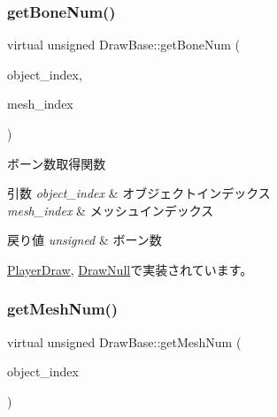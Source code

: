 \mbox{\label{class_draw_base_a9420d7257415446e8cddd1a22f139dd3}} 
\subsubsection{\texorpdfstring{get\+Bone\+Num()}{getBoneNum()}}
{\footnotesize\ttfamily virtual unsigned Draw\+Base\+::get\+Bone\+Num (\begin{DoxyParamCaption}\item[{unsigned}]{object\+\_\+index,  }\item[{unsigned}]{mesh\+\_\+index }\end{DoxyParamCaption})\hspace{0.3cm}{\ttfamily [pure virtual]}}



ボーン数取得関数 


\begin{DoxyParams}{引数}
{\em object\+\_\+index} & オブジェクトインデックス \\
\hline
{\em mesh\+\_\+index} & メッシュインデックス \\
\hline
\end{DoxyParams}

\begin{DoxyRetVals}{戻り値}
{\em unsigned} & ボーン数 \\
\hline
\end{DoxyRetVals}


\mbox{\hyperlink{class_player_draw_a716aeac1dca9a44c97bc2ea42e55d6f6}{Player\+Draw}}, \mbox{\hyperlink{class_draw_null_a74aee63e6146b7256b80610abfb3eabb}{Draw\+Null}}で実装されています。

\mbox{\label{class_draw_base_add488139aed539e7ccd19492702b4bee}} 
\subsubsection{\texorpdfstring{get\+Mesh\+Num()}{getMeshNum()}}
{\footnotesize\ttfamily virtual unsigned Draw\+Base\+::get\+Mesh\+Num (\begin{DoxyParamCaption}\item[{unsigned}]{object\+\_\+index }\end{DoxyParamCaption})\hspace{0.3cm}{\ttfamily [pure virtual]}}




